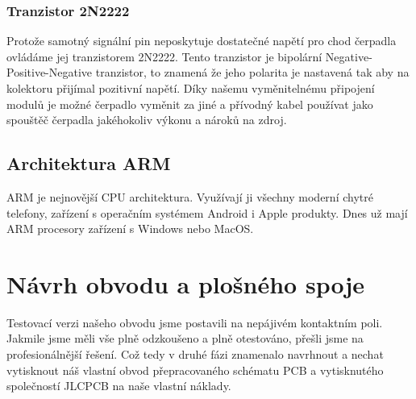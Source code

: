 \documentclass[12pt,a4paper]{article}
\begin{document}
\subsubsection{Tranzistor 2N2222}

Protože samotný signální pin neposkytuje dostatečné napětí pro chod čerpadla ovládáme jej tranzistorem 2N2222. Tento tranzistor je bipolární Negative-Positive-Negative tranzistor, to znamená že jeho polarita je nastavená tak aby na kolektoru přijímal pozitivní napětí. Díky našemu vyměnitelnému připojení modulů je možné čerpadlo vyměnit za jiné a přívodný kabel používat jako spouštěč čerpadla jakéhokoliv výkonu a nároků na zdroj.

\subsection{Architektura ARM}

\ac{ARM} je nejnovější CPU architektura. Využívají ji všechny moderní chytré telefony, zařízení s operačním systémem Android i Apple produkty. Dnes už mají \ac{ARM} procesory zařízení s Windows nebo MacOS.\@


\clearpage

\section{Návrh obvodu a plošného spoje}

Testovací verzi našeho obvodu jsme postavili na nepájivém kontaktním poli. Jakmile jsme měli vše plně odzkoušeno a plně otestováno, přešli jsme na profesionálnější řešení. Což tedy v druhé fázi znamenalo navrhnout a nechat vytisknout náš vlastní obvod přepracovaného schématu \ac{PCB} a vytisknutého společností JLCPCB na naše vlastní náklady.
\end{document}
